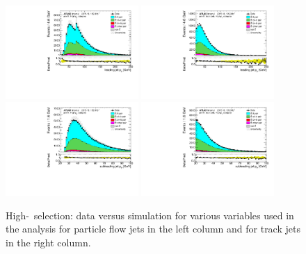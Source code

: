 \documentclass[letterpaper,12pt]{article}
\begin{document}
\begin{figure}[!h]
	\centering
	\includegraphics[width=0.45\textwidth]{figs_support/plots_hm/DataMC_h_J0_pt_all_2.pdf}
	\includegraphics[width=0.45\textwidth]{figs_support/plots_hm/DataMC_h_tjet_J0_pt_all_2.pdf}\\
	\includegraphics[width=0.45\textwidth]{figs_support/plots_hm/DataMC_h_J1_pt_all_2.pdf}
	\includegraphics[width=0.45\textwidth]{figs_support/plots_hm/DataMC_h_tjet_J1_pt_all_2.pdf}\\
	\caption{High-\pt\ selection: data versus simulation for various variables used in the analysis for 
	particle flow jets in the left column and for track jets in the right column.}
	\label{fig:kinematic_distributions_highpT}
\end{figure}
	
\end{document}
